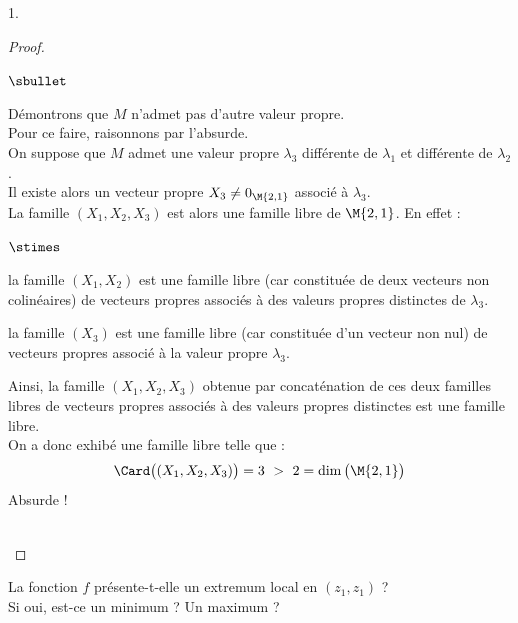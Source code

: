 \documentclass[11pt]{article}%
\begin{document}
\begin{noliste}{1.}
\begin{proof}
\begin{noliste}{$\sbullet$}
  \item Démontrons que $M$ n'admet pas d'autre valeur propre.\\
    Pour ce faire, raisonnons par l'absurde.\\
    On suppose que $M$ admet une valeur propre $\lambda_3$ différente
    de $\lambda_1$ et différente de $\lambda_2$.\\
    Il existe alors un vecteur propre $X_3 \neq 0_{\M{2,1}}$ associé à
    $\lambda_3$.\\[.2cm]
    La famille $(X_1, X_2, X_3)$ est alors une famille libre de
    $\M{2,1}$. En effet :
    \begin{noliste}{$\stimes$}
    \item la famille $(X_1, X_2)$ est une famille libre (car
      constituée de deux vecteurs non colinéaires) de vecteurs
      propres associés à des valeurs propres distinctes de $\lambda_3$.
    \item la famille $(X_3)$ est une famille libre (car constituée
      d'un vecteur non nul) de vecteurs propres associé à la valeur
      propre $\lambda_3$.
    \end{noliste}
    Ainsi, la famille $(X_1, X_2, X_3)$ obtenue par concaténation de
    ces deux familles libres de vecteurs propres associés à des
    valeurs propres distinctes est une famille libre.\\
    On a donc exhibé une famille libre telle que : 
    \[
    \Card \big( (X_1, X_2, X_3) \big) = 3 \ > \ 2 = \dim\big(\M{2,1}
    \big)
    \]
    Absurde ! %
  \end{noliste}
  ~\\[-1.4cm]
\end{proof}




\item La fonction $f$ présente-t-elle un extremum local en $(z_1,z_1)$
  ? \\
  Si oui, est-ce un minimum ? Un maximum ?


\end{noliste}
\end{document}
